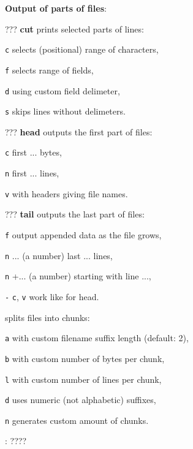 \textbf{Output of parts of files}:
\begin{compactenum}
	\item [???] \textbf{cut} prints selected parts of lines:
	\item [\texttt{c}] selects (positional) range of characters,
	\item [\texttt{f}] selects range of fields,
	\item [\texttt{d}] using custom field delimeter,
	\item [\texttt{s}] skips lines without delimeters.

	\item [???] \textbf{head} outputs the first part of files:
	\item [\texttt{c}] first ... bytes,
	\item [\texttt{n}] first ... lines,
	\item [\texttt{v}] with headers giving file names.

	\item [???] \textbf{tail} outputs the last part of files:
	\item [\texttt{f}] output appended data as the file grows,
	\item [\texttt{n}] ... (a number) last ... lines,
	\item [\texttt{n}] +... (a number) starting with line ...,
	\item [\texttt{-}] \texttt{c}, \texttt{v} work like for head.

	\item [\symbolcoreutils]  splits files into chunks:
	\item [\texttt{a}] with custom filename suffix length (default: 2),
	\item [\texttt{b}] with custom number of bytes per chunk,
	\item [\texttt{l}] with custom number of lines per chunk,
	\item [\texttt{d}] uses numeric (not alphabetic) suffixes,
	\item [\texttt{n}] generates custom amount of chunks.

	\item [\symbolcoreutils] : \dotfill ????
\end{compactenum}

